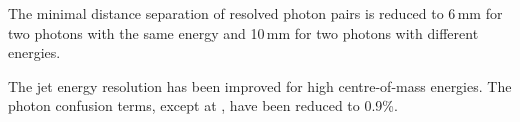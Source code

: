 The minimal distance separation of resolved photon pairs is reduced to 6\,mm for two photons with the same energy and 10\,mm for two photons with different energies.

The jet energy resolution has been improved for high centre-of-mass energies. The photon confusion terms, except at , have been reduced to 0.9\%.


